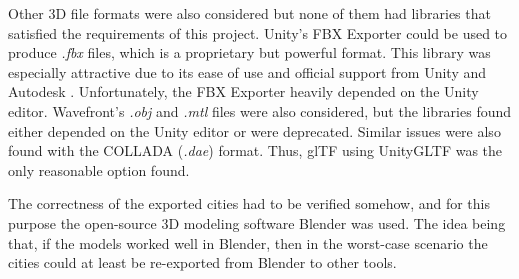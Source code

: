 Other 3D file formats were also considered but none of them had libraries that satisfied the requirements of this project.
Unity's FBX Exporter \cite{fbxexporter} could be used to produce \textit{.fbx} \cite{fbx} files, which is a proprietary but powerful format.
This library was especially attractive due to its ease of use and official support from Unity and Autodesk \cite{fbxexporter}.
Unfortunately, the FBX Exporter heavily depended on the Unity editor.
Wavefront's \textit{.obj} \cite{obj_files} and \textit{.mtl} \cite{mtl_files} files were also considered, but the libraries found either depended on the Unity editor or were deprecated.
Similar issues were also found with the COLLADA (\textit{.dae}) \cite{collada_files} format.
Thus, glTF using UnityGLTF was the only reasonable option found.

The correctness of the exported cities had to be verified somehow, and for this purpose the open-source 3D modeling software Blender \cite{blender} was used. 
The idea being that, if the models worked well in Blender, then in the worst-case scenario the cities could at least be re-exported from Blender to other tools.
